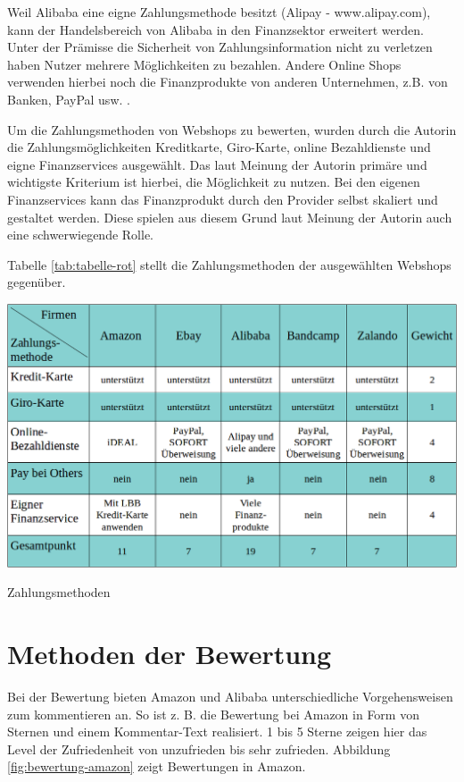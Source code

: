 Weil Alibaba eine eigne Zahlungsmethode besitzt (Alipay - www.alipay.com), kann der Handelsbereich von Alibaba in den Finanzsektor erweitert werden. Unter der Prämisse die Sicherheit von Zahlungsinformation nicht zu verletzen haben Nutzer mehrere Möglichkeiten zu bezahlen. Andere Online Shops verwenden hierbei noch die Finanzprodukte von anderen Unternehmen, z.B. von Banken, PayPal usw. .

Um die Zahlungsmethoden von Webshops zu bewerten, wurden durch die Autorin die Zahlungsmöglichkeiten Kreditkarte, Giro-Karte, online Bezahldienste und eigne Finanzservices ausgewählt. Das laut Meinung der Autorin primäre und wichtigste Kriterium ist hierbei, die Möglichkeit  zu nutzen. Bei den eigenen Finanzservices kann das Finanzprodukt durch den Provider selbst skaliert und gestaltet werden. Diese spielen aus diesem Grund laut Meinung der Autorin auch eine schwerwiegende Rolle.

Tabelle \vref{tab:tabelle-rot} stellt die Zahlungsmethoden der ausgewählten Webshops gegenüber.

\begin{table}[htbp]
	\centering
	\includegraphics[width=1\textwidth]{bilder/tabelle-blau.png}
	\caption{Zahlungsmethoden}
	\label{tab:tabelle-blau}
\end{table}


\section{Methoden der Bewertung}

Bei der Bewertung bieten Amazon und Alibaba unterschiedliche Vorgehensweisen zum kommentieren an. So ist z. B. die Bewertung bei Amazon in Form von Sternen und einem Kommentar-Text realisiert. 1 bis 5 Sterne zeigen hier das Level der Zufriedenheit von unzufrieden bis sehr zufrieden. Abbildung \vref{fig:bewertung-amazon} zeigt Bewertungen in Amazon.

